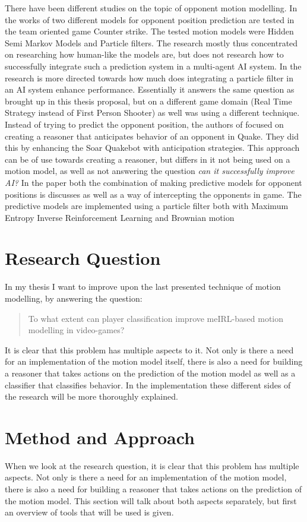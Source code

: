 \documentclass[a4paper, 12pt]{article}
\begin{document}
There have been different studies on the topic of opponent motion modelling.
In the works of \citep{Hladky_anevaluation} two different models for opponent
position prediction are tested in the team oriented game Counter strike. 
The tested motion models were
Hidden Semi Markov Models and Particle filters.
The research mostly thus concentrated on researching how human-like the
models are, but does not research how to successfully integrate such a
prediction system in a multi-agent AI system.
In \citep{weber2011aiide} the research is more directed towards how much does
integrating a particle filter in an AI system enhance performance. Essentially it answers
the same question as brought up in this thesis proposal, but on a different game
domain (Real Time Strategy instead of First Person Shooter) as well was using a
different technique. 
Instead of trying to predict the opponent position, the authors of
\citep{Laird:2001:KYG:375735.376343} focused on creating a reasoner that
anticipates behavior of an opponent in Quake. They did this by enhancing the
Soar Quakebot with anticipation strategies. This approach can be of use towards
creating a reasoner, but differs in it not being used on a motion model, as well
as not answering the question \emph{can it successfully improve AI?}
In the paper \citep{6374144} both the combination of making predictive models
for opponent positions is discusses as well as a way of intercepting the
opponents in game. The predictive models are implemented using a particle filter both
with Maximum Entropy Inverse Reinforcement Learning and Brownian motion

\section{Research Question}
In my thesis I want to improve upon the last presented technique of motion
modelling, by answering the question:
\begin{quotation}
To what extent can player classification improve meIRL-based motion modelling in video-games?
\end{quotation}
It is clear that this problem has multiple aspects to it. Not
only is there a need for an implementation of the motion model itself, there is
also a need for building a reasoner that takes actions on the prediction of the
motion model as well as a classifier that classifies behavior. 
In the implementation these different sides of the research will be
more thoroughly explained.

\section{Method and Approach}
When we look at the research question, it is clear that this problem has multiple aspects. Not
only is there a need for an implementation of the motion model, there is
also a need for building a reasoner that takes actions on the prediction of the
motion model. This section will talk about both aspects separately, but first an
overview of tools that will be used is given.
\end{document}

